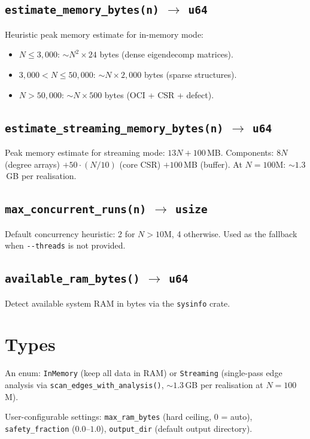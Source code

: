 \documentclass[11pt, a4paper, openany]{book}
\newcommand{\code}[1]{\texttt{#1}}
\newcommand{\func}[1]{\texttt{\color{structure}#1}}
\begin{document}
\subsection{\func{estimate\_memory\_bytes(n)} $\to$ \code{u64}}
Heuristic peak memory estimate for in-memory mode:
\begin{itemize}
  \item $N \le 3{,}000$: ${\sim}N^2 \times 24$ bytes (dense eigendecomp matrices).
  \item $3{,}000 < N \le 50{,}000$: ${\sim}N \times 2{,}000$ bytes (sparse structures).
  \item $N > 50{,}000$: ${\sim}N \times 500$ bytes (OCI + CSR + defect).
\end{itemize}

\subsection{\func{estimate\_streaming\_memory\_bytes(n)} $\to$ \code{u64}}
Peak memory estimate for streaming mode: $13N + 100$\,MB.
Components: $8N$ (degree arrays) $+ 50 \cdot (N/10)$ (core CSR) $+ 100$\,MB
(buffer).  At $N = 100$M: ${\sim}1.3$\,GB per realisation.

\subsection{\func{max\_concurrent\_runs(n)} $\to$ \code{usize}}
Default concurrency heuristic: 2 for $N > 10$M, 4 otherwise.  Used as the
fallback when \code{-{}-threads} is not provided.

\subsection{\func{available\_ram\_bytes()} $\to$ \code{u64}}
Detect available system RAM in bytes via the \code{sysinfo} crate.

\section{Types}

\begin{definition}[ExecMode]
An enum: \code{InMemory} (keep all data in RAM) or \code{Streaming} (single-pass
edge analysis via \func{scan\_edges\_with\_analysis()}, ${\sim}1.3$\,GB per
realisation at $N = 100$M).
\end{definition}

\begin{definition}[Config]
User-configurable settings: \code{max\_ram\_bytes} (hard ceiling, 0 = auto),
\code{safety\_fraction} ($0.0$--$1.0$), \code{output\_dir} (default output
directory).
\end{definition}
\end{document}
